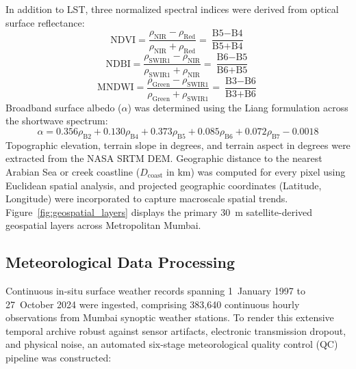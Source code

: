 \documentclass[a4paper,fleqn]{cas-sc}
\begin{document}
In addition to LST, three normalized spectral indices were derived from optical surface reflectance:
\begin{equation}
    \text{NDVI} = \frac{\rho_{\text{NIR}} - \rho_{\text{Red}}}{\rho_{\text{NIR}} + \rho_{\text{Red}}} = \frac{\text{B5} - \text{B4}}{\text{B5} + \text{B4}}
    \label{eq:ndvi}
\end{equation}
\begin{equation}
    \text{NDBI} = \frac{\rho_{\text{SWIR1}} - \rho_{\text{NIR}}}{\rho_{\text{SWIR1}} + \rho_{\text{NIR}}} = \frac{\text{B6} - \text{B5}}{\text{B6} + \text{B5}}
    \label{eq:ndbi}
\end{equation}
\begin{equation}
    \text{MNDWI} = \frac{\rho_{\text{Green}} - \rho_{\text{SWIR1}}}{\rho_{\text{Green}} + \rho_{\text{SWIR1}}} = \frac{\text{B3} - \text{B6}}{\text{B3} + \text{B6}}
    \label{eq:mndwi}
\end{equation}
Broadband surface albedo ($\alpha$) was determined using the Liang formulation across the shortwave spectrum:
\begin{equation}
    \alpha = 0.356 \rho_{\text{B2}} + 0.130 \rho_{\text{B4}} + 0.373 \rho_{\text{B5}} + 0.085 \rho_{\text{B6}} + 0.072 \rho_{\text{B7}} - 0.0018
    \label{eq:albedo}
\end{equation}
Topographic elevation, terrain slope in degrees, and terrain aspect in degrees were extracted from the NASA SRTM DEM. Geographic distance to the nearest Arabian Sea or creek coastline ($D_{\text{coast}}$ in km) was computed for every pixel using Euclidean spatial analysis, and projected geographic coordinates (Latitude, Longitude) were incorporated to capture macroscale spatial trends. Figure~\ref{fig:geospatial_layers} displays the primary 30~m satellite-derived geospatial layers across Metropolitan Mumbai.

\subsection{Meteorological Data Processing}
\label{subsec:meteorological_processing}

Continuous in-situ surface weather records spanning 1~January 1997 to 27~October 2024 were ingested, comprising 383,640 continuous hourly observations from Mumbai synoptic weather stations. To render this extensive temporal archive robust against sensor artifacts, electronic transmission dropout, and physical noise, an automated six-stage meteorological quality control (QC) pipeline was constructed:
\end{document}
